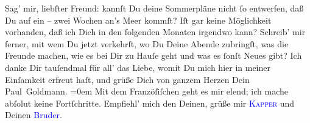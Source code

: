            \pstart
           Sag’ mir, liebſter Freund: kannſt Du deine  Sommerpläne nicht ſo entwerfen, daß Du auf ein – zwei Wochen an’s Meer kommſt?
               Iſt gar keine Möglichkeit vorhanden, daß ich Dich in \introOben{}den\introOben{}
               folgenden Monaten irgendwo \label{K_L02668-111v}\label{K_L02668-111h}
               kann?\pend
           \pstart
           Schreib’ mir ferner, mit wem Du jetzt verkehrſt, wo Du Deine Abende zubringſt, was
                  {\pb}die Freunde machen, wie es bei Dir zu Hauſe geht
               und was es ſonſt Neues gibt?\pend
           \pstart
           Ich danke Dir tauſendmal für all’ das Liebe, womit Du mich hier in meiner Einſamkeit
               erfreut haſt, und grüße Dich von ganzem Herzen\pend
           \pstart
           Dein \damage{\textcolor{gray}{treuer}}{\\[\baselineskip]}\spacefill\mbox{Paul Goldmann.}\pend
           \leftskip=0em{}\pstart
           \noindent{}Mit dem Franzöſiſchen geht es mir elend; ich mache abſolut keine Fortſchritte.\pend
           \pstart
           Empfiehl’ mich den Deinen, grüße mir \textsc{\textcolor{blue}{Kapper}{}\ledrightnote{\textcolor{blue}{Friedrich Kapper}}} und Deinen \textcolor{blue}{Bruder}{}.\pend
           \endnumbering{}  
      